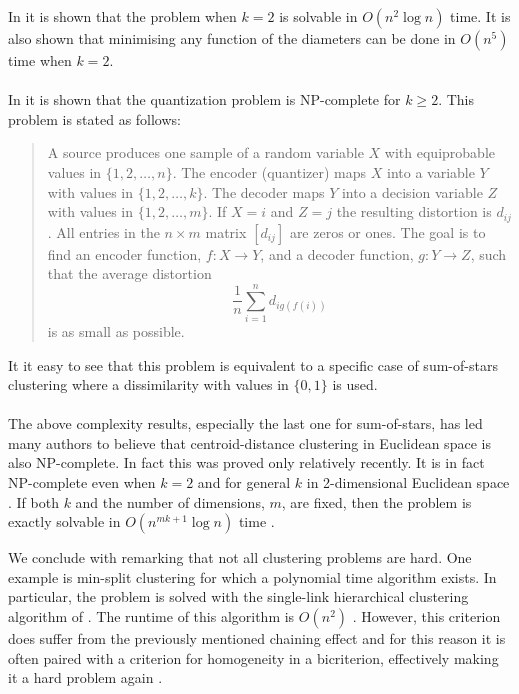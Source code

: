 \documentclass[a4paper]{report}
\begin{document}
In \citet{hansen87sumofdiameters} it is shown that the problem when $k=2$ is
solvable in $O(n^2 \log n)$ time.  It is also shown that minimising any
function of the diameters can be done in $O(n^5)$ time when $k=2$.
\\\\
\noindent In \citet{garey82quant} it is shown that the quantization problem is
NP-complete for $k \geq 2$.  This problem is stated as follows:
\begin{quote}
  A source produces one sample of a random variable $X$ with equiprobable
  values in $\{1,2,\dotsc,n\}$.  The encoder (quantizer) maps $X$ into a
  variable $Y$ with values in $\{1,2,\dotsc,k\}$. The decoder maps $Y$ into a
  decision variable $Z$ with values in $\{1,2,\dotsc,m\}$. If $X = i$ and $Z =
  j$ the resulting distortion is $d_{ij}$.  All entries in the $n \times m$
  matrix $[d_{ij}]$ are zeros or ones. The goal is to find an encoder
  function, $f \colon X \to Y$, and a decoder function, $g \colon Y \to Z$,
  such that the average distortion
  \begin{equation*}
    \frac{1}{n} \sum_{i=1}^{n} d_{ig(f(i))}
  \end{equation*}
  is as small as possible.
\end{quote}
It it easy to see that this problem is equivalent to a specific case of
sum-of-stars clustering where a dissimilarity with values in $\{0,1\}$ is
used.
\\\\
\noindent The above complexity results, especially the last one for
sum-of-stars, has led many authors to believe that centroid-distance
clustering in Euclidean space is also NP-complete.  In fact this was proved
only relatively recently.  It is in fact NP-complete even when $k=2$
\citep{aloise09exact} and for general $k$ in 2-dimensional Euclidean space
\citep{mahajan09}.  If both $k$ and the number of dimensions, $m$, are fixed,
then the problem is exactly solvable in $O(n^{mk+1} \log n)$ time
\citep{inaba94weightedvoronoi}.

We conclude with remarking that not all clustering problems are hard.  One
example is min-split clustering for which a polynomial time algorithm exists.
In particular, the problem is solved with the single-link hierarchical
clustering algorithm of \citet{johnson67hierarchical}.  The runtime of this
algorithm is $O(n^2)$ \citep{delattre1980bicriterion}.  However, this
criterion does suffer from the previously mentioned chaining effect and for
this reason it is often paired with a criterion for homogeneity in a
bicriterion, effectively making it a hard problem again
\citep{delattre1980bicriterion}.
\end{document}
